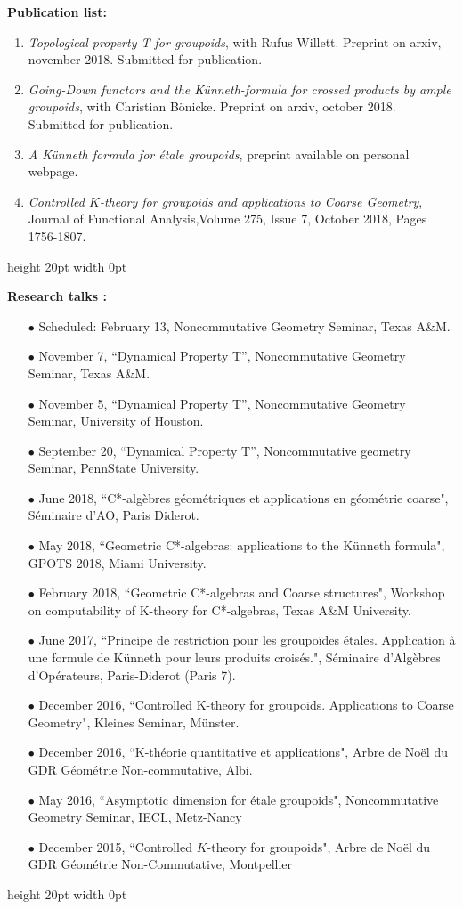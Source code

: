 \documentclass[a4paper,11pt]{article}
\newcommand\espace{\vrule height 20pt width 0pt}
\begin{document}
\textbf{Publication list:} 
\begin{enumerate}
\item \textit{Topological property T for groupoids}, with Rufus Willett. Preprint on arxiv, november 2018. Submitted for publication.
\item \textit{Going-Down functors and the Künneth-formula for crossed products by ample groupoids}, with Christian Bönicke. Preprint on arxiv, october 2018. Submitted for publication.
\item \textit{A K\"{u}nneth formula for \'etale groupoids}, preprint available on personal webpage.
\item \textit{Controlled $K$-theory for groupoids and applications to Coarse Geometry}, Journal of Functional Analysis,Volume 275, Issue 7, October 2018, Pages 1756-1807. 
\end{enumerate}
\espace

\textbf{Research talks :}\\

\begin{itemize}
\item[$\bullet$] Scheduled: February 13, Noncommutative Geometry Seminar, Texas A\&M.
\item[$\bullet$] November 7, ``Dynamical Property T'', Noncommutative Geometry Seminar, Texas A\&M.
\item[$\bullet$] November 5, ``Dynamical Property T'', Noncommutative Geometry Seminar, University of Houston.
\item[$\bullet$] September 20, ``Dynamical Property T'', Noncommutative geometry Seminar, PennState University.
\item[$\bullet$] June 2018, ``C*-alg\`ebres g\'eom\'etriques et applications en g\'eom\'etrie coarse", S\'eminaire d'AO, Paris Diderot.
\item[$\bullet$] May 2018, ``Geometric C*-algebras: applications to the K\"unneth formula", GPOTS 2018, Miami University.
\item[$\bullet$] February 2018, ``Geometric C*-algebras and Coarse structures", Workshop on computability of K-theory for C*-algebras, Texas A\&M University.
\item[$\bullet$] June 2017, ``Principe de restriction pour les groupoïdes étales. Application à une formule de Künneth pour leurs produits croisés.", Séminaire d'Algèbres d'Opérateurs, Paris-Diderot (Paris 7).
\item[$\bullet$] December 2016, ``Controlled K-theory for groupoids. Applications to Coarse Geometry", Kleines Seminar, Münster.
\item[$\bullet$] December 2016, ``K-théorie quantitative et applications", Arbre de Noël du GDR Géométrie Non-commutative, Albi.
\item[$\bullet$] May 2016, ``Asymptotic dimension for étale groupoids", Noncommutative Geometry Seminar, IECL, Metz-Nancy
\item[$\bullet$] December 2015, ``Controlled $K$-theory for groupoids", Arbre de Noël du GDR Géométrie Non-Commutative, Montpellier
\end{itemize}
\espace
\end{document}
